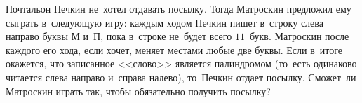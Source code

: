 \begin{problems}
\item
Почтальон Печкин не~хотел отдавать посылку.
Тогда Матроскин предложил ему сыграть в~следующую игру: каждым ходом Печкин
пишет в~строку слева направо буквы \textsf{М} и~\textsf{П}, пока в~строке
не~будет всего $11$~букв.
Матроскин после каждого его хода, если хочет, меняет местами любые две буквы.
Если в~итоге окажется, что записанное <<слово>> является палиндромом
(то~есть одинаково читается слева направо и~справа налево), то~Печкин отдает
посылку.
Сможет~ли Матроскин играть так, чтобы обязательно получить посылку?

\end{problems}

